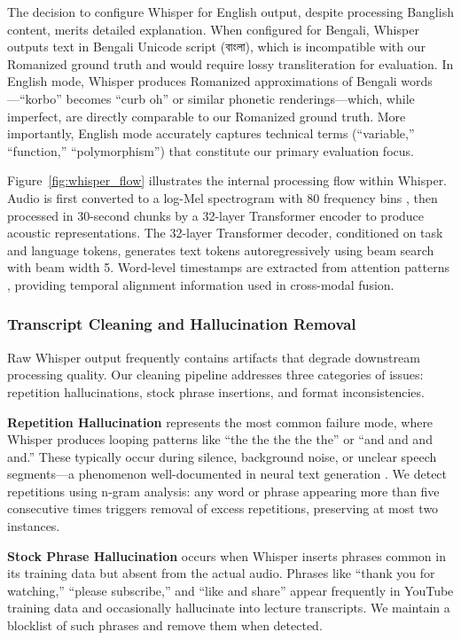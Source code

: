 The decision to configure Whisper for English output, despite processing Banglish content, merits detailed explanation. When configured for Bengali, Whisper outputs text in Bengali Unicode script (বাংলা), which is incompatible with our Romanized ground truth and would require lossy transliteration for evaluation. In English mode, Whisper produces Romanized approximations of Bengali words---``korbo'' becomes ``curb oh'' or similar phonetic renderings---which, while imperfect, are directly comparable to our Romanized ground truth. More importantly, English mode accurately captures technical terms (``variable,'' ``function,'' ``polymorphism'') that constitute our primary evaluation focus.

Figure~\ref{fig:whisper_flow} illustrates the internal processing flow within Whisper. Audio is first converted to a log-Mel spectrogram with 80 frequency bins \cite{Davis1980}, then processed in 30-second chunks by a 32-layer Transformer encoder to produce acoustic representations. The 32-layer Transformer decoder, conditioned on task and language tokens, generates text tokens autoregressively using beam search with beam width 5. Word-level timestamps are extracted from attention patterns \cite{Luong2015}, providing temporal alignment information used in cross-modal fusion.

\subsubsection{Transcript Cleaning and Hallucination Removal}

Raw Whisper output frequently contains artifacts that degrade downstream processing quality. Our cleaning pipeline addresses three categories of issues: repetition hallucinations, stock phrase insertions, and format inconsistencies.

\textbf{Repetition Hallucination} represents the most common failure mode, where Whisper produces looping patterns like ``the the the the the'' or ``and and and and.'' These typically occur during silence, background noise, or unclear speech segments---a phenomenon well-documented in neural text generation \cite{Holtzman2020, Ji2023}. We detect repetitions using n-gram analysis: any word or phrase appearing more than five consecutive times triggers removal of excess repetitions, preserving at most two instances.

\textbf{Stock Phrase Hallucination} occurs when Whisper inserts phrases common in its training data but absent from the actual audio. Phrases like ``thank you for watching,'' ``please subscribe,'' and ``like and share'' appear frequently in YouTube training data and occasionally hallucinate into lecture transcripts. We maintain a blocklist of such phrases and remove them when detected.

